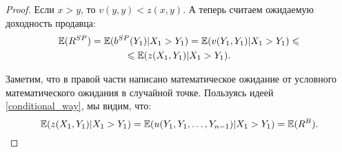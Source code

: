 \begin{proof}
Если $ x>y $, то $ v(y,y)<z(x,y) $. А теперь считаем ожидаемую доходность продавца:
\begin{multline}
\operatorname{\mathbb{E}}(R^{SP})=\operatorname{\mathbb{E}}(b^{SP}(Y_{1})|X_{1}>Y_{1})=\operatorname{\mathbb{E}}(v(Y_{1},Y_{1})|X_{1}>Y_{1})\leqslant\\
\leqslant \operatorname{\mathbb{E}}(z(X_{1},Y_{1})|X_{1}>Y_{1}).
\end{multline}

Заметим, что в правой части написано математическое ожидание от условного математического ожидания в случайной точке. Пользуясь идеей \ref{conditional_way}, мы видим, что:
\begin{equation}
\operatorname{\mathbb{E}}(z(X_{1},Y_{1})|X_{1}>Y_{1})=\operatorname{\mathbb{E}}(u(Y_{1},Y_{1},\ldots,Y_{n-1})|X_{1}>Y_{1})=\operatorname{\mathbb{E}}(R^{B}).
\end{equation}

\end{proof}

